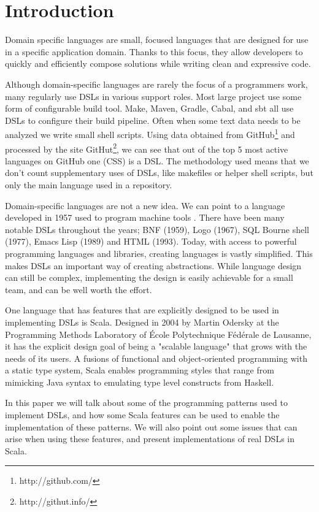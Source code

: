 \chapter{Introduction}

Domain specific languages are small, focused languages that are designed for use in a specific application domain. Thanks to this focus, they allow developers to quickly and efficiently compose solutions while writing clean and expressive code.

Although domain-specific languages are rarely the focus of a programmers work, many regularly use DSLs in various support roles. Most large project use some form of configurable build tool. Make, Maven, Gradle, Cabal, and sbt all use DSLs to configure their build pipeline. Often when some text data needs to be analyzed we write small shell scripts. Using data obtained from GitHub\footnote{http://github.com/} and processed by the site GitHut\footnote{http://githut.info/}, we can see that out of the top 5 most active languages on GitHub one (CSS) is a DSL. The methodology used means that we don't count supplementary uses of DSLs, like makefiles or helper shell scripts, but only the main language used in a repository.

Domain-specific languages are not a new idea. We can point to a language developed in 1957 used to program machine tools \cite{Ross:1978}. There have been many notable DSLs throughout the years; BNF (1959), Logo (1967), SQL Bourne shell (1977), Emacs Lisp (1989) and HTML (1993). Today, with access to powerful programming languages and libraries, creating languages is vastly simplified. This makes DSLs an important way of creating abstractions. While language design can still be complex, implementing the design is easily achievable for a small team, and can be well worth the effort.

One language that has features that are explicitly designed to be used in implementing DSLs is Scala. Designed in 2004 by Martin Odersky at the Programming Methods Laboratory of \'Ecole Polytechnique F\'ed\'erale de Lausanne, it has the explicit design goal of being a "scalable language" that grows with the needs of its users.
A fusions of functional and object-oriented programming with a static type system, Scala enables programming styles that range from mimicking Java syntax to emulating type level constructs from Haskell.

In this paper we will talk about some of the programming patterns used to implement DSLs, and how some Scala features can be used to enable the implementation of these patterns. We will also point out some issues that can arise when using these features, and present implementations of real DSLs in Scala.